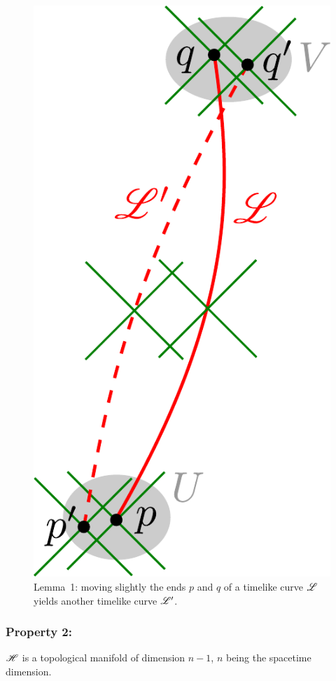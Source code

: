 \begin{figure}
\centerline{\includegraphics[height=0.3\textheight]{glo_timelike_stab.pdf}}
\caption[]{\label{f:glo:timelike_stab} \footnotesize
Lemma~1: moving slightly the ends $p$ and $q$ of a timelike curve $\mathscr{L}$
yields another timelike curve $\mathscr{L}'$.}
\end{figure}


\subsubsection{Property 2:}
\begin{greybox}
$\mathscr{H}$ is a topological manifold of dimension $n-1$, $n$ being the spacetime
dimension.
\end{greybox}

